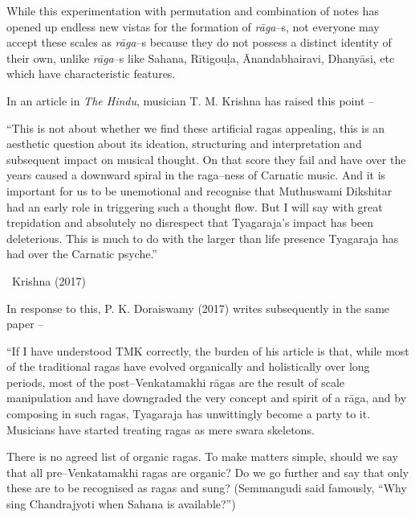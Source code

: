 \vspace{-.3cm}

While this experimentation with permutation and combination of notes has opened up endless new vistas for the formation of \textit{rāga}–s, not everyone may accept these scales as \textit{rāga}–s because they do not possess a distinct identity of their own, unlike \textit{rāga}–s like Sahana, Rītigouḷa, Ānandabhairavi, Dhanyāsi, etc which have characteristic features.

In an article in \textit{The Hindu}, musician T. M. Krishna has raised this point –

\begin{myquote}
“This is not about whether we find these artificial ragas appealing, this is an aesthetic question about its ideation, structuring and interpretation and subsequent impact on musical thought. On that score they fail and have over the years caused a downward spiral in the raga–ness of Carnatic music. And it is important for us to be unemotional and recognise that Muthuswami Dikshitar had an early role in triggering such a thought flow. But I will say with great trepidation and absolutely no disrespect that Tyagaraja’s impact has been deleterious. This is much to do with the larger than life presence Tyagaraja has had over the Carnatic psyche.” 

~\hfill Krishna (2017)
\end{myquote}

In response to this, P. K. Doraiswamy (2017) writes subsequently in the same paper –

\begin{myquote}
“If I have understood TMK correctly, the burden of his article is that, while most of the traditional ragas have evolved organically and holistically over long periods, most of the post–Venkatamakhi rāgas are the result of scale manipulation and have downgraded the very concept and spirit of a rāga, and by composing in such ragas, Tyagaraja has unwittingly become a party to it. Musicians have started treating ragas as mere swara skeletons.
\end{myquote}

\begin{myquote}
There is no agreed list of organic ragas. To make matters simple, should we say that all pre–Venkatamakhi ragas are organic? Do we go further and say that only these are to be recognised as ragas and sung? (Semmangudi said famously, “Why sing Chandrajyoti when Sahana is available?”)
\end{myquote}

